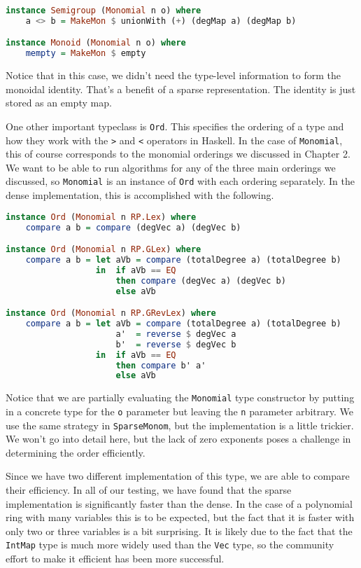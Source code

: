 \documentclass[MS, xcolor=dvipsnames]{wfuthesis}
\theoremstyle{definition}
\begin{document}
\begin{lstlisting}[language=Haskell]
instance Semigroup (Monomial n o) where
    a <> b = MakeMon $ unionWith (+) (degMap a) (degMap b)

instance Monoid (Monomial n o) where
    mempty = MakeMon $ empty
\end{lstlisting}
Notice that in this case, we didn't need the type-level information to form the monoidal identity. That's a benefit of a sparse representation. The identity is just stored as an empty map. \par
One other important typeclass is \lstinline{Ord}. This specifies the ordering of a type and how they work with the \lstinline{>} and \lstinline{<} operators in Haskell. In the case of \lstinline{Monomial}, this  of course corresponds to the monomial orderings we discussed in Chapter 2. We want to be able to run algorithms for any of the three main orderings we discussed, so \lstinline{Monomial} is an instance of \lstinline{Ord} with each ordering separately. In the dense implementation, this is accomplished with the following.
\begin{lstlisting}[language=Haskell]
instance Ord (Monomial n RP.Lex) where
    compare a b = compare (degVec a) (degVec b)

instance Ord (Monomial n RP.GLex) where
    compare a b = let aVb = compare (totalDegree a) (totalDegree b)
                  in  if aVb == EQ
                      then compare (degVec a) (degVec b)
                      else aVb

instance Ord (Monomial n RP.GRevLex) where
    compare a b = let aVb = compare (totalDegree a) (totalDegree b)
                      a'  = reverse $ degVec a
                      b'  = reverse $ degVec b
                  in  if aVb == EQ
                      then compare b' a'
                      else aVb
\end{lstlisting}
Notice that we are partially evaluating the \lstinline{Monomial} type constructor by putting in a concrete type for the \lstinline{o} parameter but leaving the \lstinline{n} parameter arbitrary. We use the same strategy in \lstinline{SparseMonom}, but the implementation is a little trickier. We won't go into detail here, but the lack of zero exponents poses a challenge in determining the order efficiently. \par
Since we have two different implementation of this type, we are able to compare their efficiency. In all of our testing, we have found that the sparse implementation is significantly faster than the dense. In the case of a polynomial ring with many variables this is to be expected, but the fact that it is faster with only two or three variables is a bit surprising. It is likely due to the fact that the \lstinline{IntMap} type is much more widely used than the \lstinline{Vec} type, so the community effort to make it efficient has been more successful. \par
\end{document}
